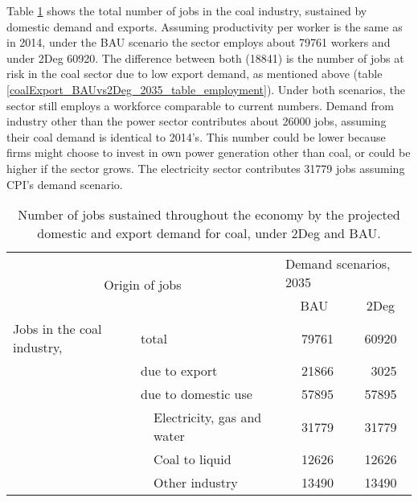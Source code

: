 \documentclass[12pt,english]{article}
\begin{document}
Table \ref{coalExport_BAUvs2Deg_2035} shows the total number of jobs in the coal industry, sustained by domestic demand and exports. Assuming productivity per worker is the same as in 2014, under the BAU scenario the sector employs about 79761 workers and under 2Deg 60920. The difference between both (18841) is the number of jobs at risk in the coal sector due to low export demand, as mentioned above (table \ref{coalExport_BAUvs2Deg_2035_table_employment}). Under both scenarios, the sector still employs a workforce comparable to current numbers. Demand from industry other than the power sector contributes about 26000 jobs, assuming their coal demand is identical to 2014's. This number could be lower because firms might choose to invest in own power generation other than coal, or could be higher if the sector grows. The electricity sector contributes 31779 jobs assuming CPI's demand scenario.

\begin{table}[ht]
	\centering
	\begin{tabular}{lp{20pt}lcc}
		\toprule
		\multicolumn{3}{c}{\multirow{2}{100pt}{Origin of jobs}} &\multicolumn{2}{l}{Demand scenarios, 2035}   \\ 
		\multicolumn{3}{c}{} & BAU & 2Deg \\ 
		\midrule
		Jobs in the coal industry,	& \multicolumn{2}{l}{total}  &\ 79761  & 60920  \\ 
		\midrule
		& \multicolumn{2}{l}{due to export}  	   &\  21866 & \ 3025  \\ 
		& \multicolumn{2}{l}{due to domestic use}  &\  57895 & 57895 \\ 
		& 	 & Electricity, gas and water 		   &\  31779 & 31779  \\ 
		&    & Coal to liquid &\  12626  & 12626 \\ 
		&    & Other industry &\   13490 & 13490  \\ 														
		\bottomrule
	\end{tabular}
	\caption{\label{coalExport_BAUvs2Deg_2035}Number of jobs sustained throughout the economy by the projected domestic and export demand for coal, under 2Deg and BAU.}
\end{table}


\end{document}
